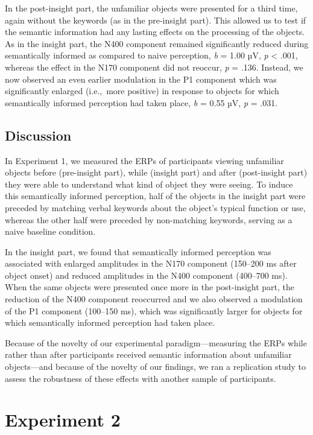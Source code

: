 \documentclass[
  english,
  man,floatsintext]{apa7}
\begin{document}
In the post-insight part, the unfamiliar objects were presented for a third time, again without the keywords (as in the pre-insight part). This allowed us to test if the semantic information had any lasting effects on the processing of the objects. As in the insight part, the N400 component remained significantly reduced during semantically informed as compared to naive perception, \emph{b} = 1.00 µV, \emph{p} \textless{} .001, whereas the effect in the N170 component did not reoccur, \emph{p} = .136. Instead, we now observed an even earlier modulation in the P1 component which was significantly enlarged (i.e.,~more positive) in response to objects for which semantically informed perception had taken place, \emph{b} = 0.55 µV, \emph{p} = .031.

\hypertarget{discussion}{%
\subsection{Discussion}\label{discussion}}

In Experiment 1, we measured the ERPs of participants viewing unfamiliar objects before (pre-insight part), while (insight part) and after (post-insight part) they were able to understand what kind of object they were seeing. To induce this semantically informed perception, half of the objects in the insight part were preceded by matching verbal keywords about the object's typical function or use, whereas the other half were preceded by non-matching keywords, serving as a naive baseline condition.

In the insight part, we found that semantically informed perception was associated with enlarged amplitudes in the N170 component (150--200 ms after object onset) and reduced amplitudes in the N400 component (400--700 ms). When the same objects were presented once more in the post-insight part, the reduction of the N400 component reoccurred and we also observed a modulation of the P1 component (100--150 ms), which was significantly larger for objects for which semantically informed perception had taken place.

Because of the novelty of our experimental paradigm---measuring the ERPs while rather than after participants received semantic information about unfamiliar objects---and because of the novelty of our findings, we ran a replication study to assess the robustness of these effects with another sample of participants.

\hypertarget{experiment-2}{%
\section{Experiment 2}\label{experiment-2}}
\end{document}
